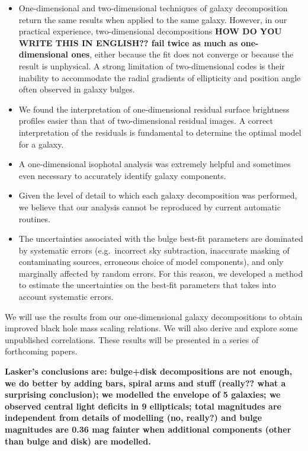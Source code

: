 \documentclass[preprint2]{emulateapj}
\begin{document}
\begin{itemize}
\item One-dimensional and two-dimensional techniques of galaxy decomposition return the same results when applied to the same galaxy.
However, in our practical experience, two-dimensional decompositions {\bf HOW DO YOU WRITE THIS IN ENGLISH?? fail twice as much as one-dimensional ones}, 
either because the fit does not converge or because the result is unphysical. 
A strong limitation of two-dimensional codes is their inability to accommodate the radial gradients of ellipticity and position angle 
often observed in galaxy bulges.
\item We found the interpretation of one-dimensional residual surface brightness profiles easier than that of two-dimensional residual images. 
A correct interpretation of the residuals is fundamental to determine the optimal model for a galaxy.
\item A one-dimensional isophotal analysis was extremely helpful and sometimes even necessary to accurately identify galaxy components.
\item Given the level of detail to which each galaxy decomposition was performed, 
we believe that our analysis cannot be reproduced by current automatic routines. 
\item The uncertainties associated with the bulge best-fit parameters are dominated by systematic errors (e.g.~incorrect sky subtraction, 
inaccurate masking of contaminating sources, erroneous choice of model components), and only marginally affected by random errors. 
For this reason, we developed a method to estimate the uncertainties on the best-fit parameters that takes into account systematic errors.
\end{itemize}

We will use the results from our one-dimensional galaxy decompositions to obtain improved black hole mass scaling relations. 
We will also derive and explore some unpublished correlations. 
These results will be presented in a series of forthcoming papers.

{\bf Lasker's conclusions are: bulge+disk decompositions are not enough, we do better by adding bars, spiral arms and stuff (really?? what a surprising conclusion);
we modelled the envelope of 5 galaxies; we observed central light deficits in 9 ellipticals; total magnitudes are independent from details of modelling (no, really?)
and bulge magnitudes are 0.36 mag fainter when additional components (other than bulge and disk) are modelled.  }
\end{document}
